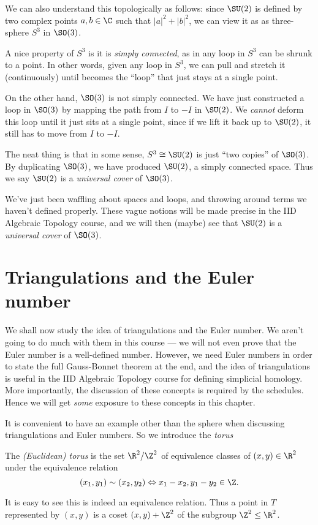 \documentclass[a4paper]{article}
\begin{document}
We can also understand this topologically as follows: since $\SU(2)$ is defined by two complex points $a, b \in \C$ such that $|a|^2 + |b|^2$, we can view it as as three-sphere $S^3$ in $\SO(3)$.

A nice property of $S^3$ is it is \emph{simply connected}, as in any loop in $S^3$ can be shrunk to a point. In other words, given any loop in $S^3$, we can pull and stretch it (continuously) until becomes the ``loop'' that just stays at a single point.

On the other hand, $\SO(3)$ is not simply connected. We have just constructed a loop in $\SO(3)$ by mapping the path from $I$ to $-I$ in $\SU(2)$. We \emph{cannot} deform this loop until it just sits at a single point, since if we lift it back up to $\SU(2)$, it still has to move from $I$ to $-I$.

The neat thing is that in some sense, $S^3 \cong \SU(2)$ is just ``two copies'' of $\SO(3)$. By duplicating $\SO(3)$, we have produced $\SU(2)$, a simply connected space. Thus we say $\SU(2)$ is a \emph{universal cover} of $\SO(3)$.

We've just been waffling about spaces and loops, and throwing around terms we haven't defined properly. These vague notions will be made precise in the IID Algebraic Topology course, and we will then (maybe) see that $\SU(2)$ is a \emph{universal cover} of $\SO(3)$.

\section{Triangulations and the Euler number}
We shall now study the idea of triangulations and the Euler number. We aren't going to do much with them in this course --- we will not even prove that the Euler number is a well-defined number. However, we need Euler numbers in order to state the full Gauss-Bonnet theorem at the end, and the idea of triangulations is useful in the IID Algebraic Topology course for defining simplicial homology. More importantly, the discussion of these concepts is required by the schedules. Hence we will get \emph{some} exposure to these concepts in this chapter.

It is convenient to have an example other than the sphere when discussing triangulations and Euler numbers. So we introduce the \emph{torus}
\begin{defi}
  The \emph{(Euclidean) torus} is the set $\R^2/\Z^2$ of equivalence classes of $(x, y) \in \R^2$ under the equivalence relation
  \[
    (x_1, y_1) \sim (x_2, y_2) \Leftrightarrow x_1 - x_2, y_1 - y_2 \in \Z.
  \]
\end{defi}
It is easy to see this is indeed an equivalence relation. Thus a point in $T$ represented by $(x, y)$ is a coset $(x, y) + \Z^2$ of the subgroup $\Z^2 \leq \R^2$.
\end{document}
